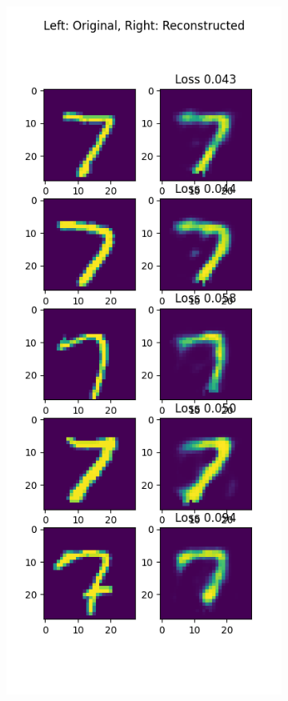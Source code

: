 \begin{solve}
\begin{figure}[H]
\begin{subfigure}{.5\textwidth}
      \end{subfigure}%
      \begin{subfigure}{.5\textwidth}
        \centering
        \includegraphics[width=.9\linewidth]{plots/output_7.png}

\end{subfigure}
\end{figure}
\end{solve}
